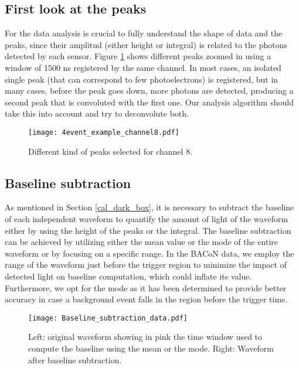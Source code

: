 \documentclass[11pt,a4paper,english,oneside, pdf]{article}
\begin{document}
	\subsection{First look at the peaks}
	
	For the data analysis is crucial to fully understand the shape of data and the peaks, since their amplitud (either height or integral) is related to the photons detected by each sensor. Figure \ref{fig:4event_example_channel8} shows different peaks zoomed in using a window of 1500 ns registered by the same channel. In most cases, an isolated single peak (that can correspond to few photoelectrons) is registered, but in many cases, before the peak goes down, more photons are detected, producing a second peak that is convoluted with the first one. Our analysis algorithm should take this into account and try to deconvolute both.
	
	\begin{figure}[!h]
		\begin{center}
			\texttt{[image: 4event\_example\_channel8.pdf]}
			\caption{Different kind of peaks selected for channel 8.}
			\label{fig:4event_example_channel8}
		\end{center}
	\end{figure}
	
	
	\subsection{Baseline subtraction}
	
	As mentioned in Section \ref{cal_dark_box}, it is necessary to subtract the baseline of each independent waveform to quantify the amount of light of the waveform either by using the height of the peaks or the integral. The baseline subtraction can be achieved by utilizing either the mean value or the mode of the entire waveform or by focusing on a specific range. In the BACoN data, we employ the range of the waveform just before the trigger region to minimize the impact of detected light on baseline computation, which could inflate its value. Furthermore, we opt for the mode as it has been determined to provide better accuracy in case a background event falls in the region before the trigger time.
	
	\begin{figure}[!h]
		\begin{center}
			\texttt{[image: Baseline\_subtraction\_data.pdf]}
			\caption{Left: original waveform showing in pink the time window used to compute the baseline using the mean or the mode. Right: Waveform after baseline subtraction.}
			\label{fig:Baseline_subtraction_data}
		\end{center}
	\end{figure}
	
\end{document}
